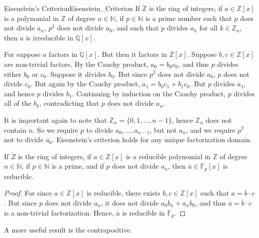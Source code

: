     \begin{ftheorem}{Eisenstein's Criterion}{Eisenstein_Criterion}
        If $\ring{\mathbb{Z}}$ is the ring of integers, if
        $a\in\mathbb{Z}[x]$ is a polynomial in $\mathbb{Z}$ of degree
        $n\in\mathbb{N}$, if $p\in\mathbb{N}$ is a prime number such that
        $p$ does not divide $a_{n}$, $p^{2}$ does not divide $a_{0}$, and
        such that $p$ divides $a_{k}$ for all $k\in\mathbb{Z}_{n}$, then $a$
        is irreducible in $\mathbb{Q}[x]$.
    \end{ftheorem}
    \begin{bproof}
        For suppose $a$ factors in $\mathbb{Q}[x]$. But then it factors in
        $\mathbb{Z}[x]$. Suppose $b,c\in\mathbb{Z}[x]$ are non-trivial
        factors. By the Cauchy product, $a_{0}=b_{0}c_{0}$, and thus
        $p$ divides either $b_{0}$ or $c_{0}$. Suppose it divides $b_{0}$.
        But since $p^{2}$ does not divide $a_{0}$, $p$ does not divide
        $c_{0}$. But again by the Cauchy product,
        $a_{1}=b_{0}c_{1}+b_{1}c_{0}$. But $p$ divides $a_{1}$, and hence
        $p$ divides $b_{1}$. Continuing by induction on the Cauchy product,
        $p$ divides all of the $b_{k}$, contradicting that $p$ does not
        divide $a_{n}$.
    \end{bproof}
    It is important again to note that $\mathbb{Z}_{n}=\{0,1,\dots,n-1\}$,
    hence $\mathbb{Z}_{n}$ does not contain $n$. So we require $p$ to divide
    $a_{0},\dots,a_{n-1}$, but not $a_{n}$, and we require $p^{2}$ not to
    divide $a_{0}$. Eisenstein's criterion holds for any unique
    factorization domain.
    \begin{theorem}
        If $\ring{Z}$ is the ring of integers, if $a\in\mathbb{Z}[x]$ is a
        reducible polynomial in $\mathbb{Z}$ of degree $n\in\mathbb{N}$, if
        $p\in\mathbb{N}$ is a prime, and if $p$ does not divide $a_{n}$,
        then $\overline{a}\in\mathbb{F}_{p}[x]$ is reducible.
    \end{theorem}
    \begin{proof}
        For since $a\in\mathbb{Z}[x]$ is reducible, there exists
        $b,c\in\mathbb{Z}[x]$ such that $a=b\cdot{c}$. But since
        $p$ does not divide $a_{n}$, it does not divide
        $a_{0}b_{n}+a_{n}b_{0}$, and thus
        $\overline{a}=\overline{b}\cdot\overline{c}$ is a non-trivial
        factorization. Hence, $\overline{a}$ is reducible in
        $\mathbb{F}_{p}$.
    \end{proof}
    A more useful result is the contrapositive.
